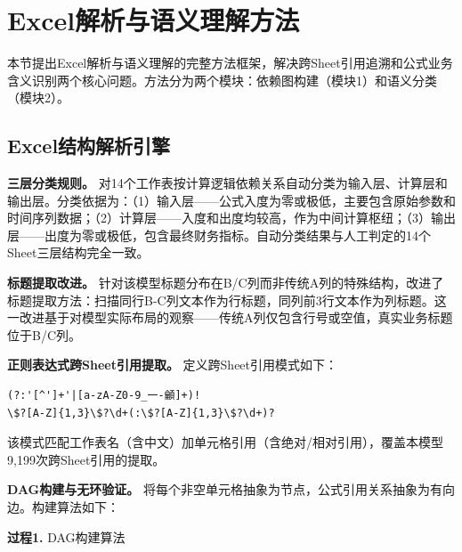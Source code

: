 \section{\heiti Excel解析与语义理解方法}

本节提出Excel解析与语义理解的完整方法框架，解决跨Sheet引用追溯和公式业务含义识别两个核心问题。方法分为两个模块：依赖图构建（模块1）和语义分类（模块2）。

\subsection{\heiti Excel结构解析引擎}

\textbf{三层分类规则。} 对14个工作表按计算逻辑依赖关系自动分类为输入层、计算层和输出层。分类依据为：（1）输入层——公式入度为零或极低，主要包含原始参数和时间序列数据；（2）计算层——入度和出度均较高，作为中间计算枢纽；（3）输出层——出度为零或极低，包含最终财务指标。自动分类结果与人工判定的14个Sheet三层结构完全一致。

\textbf{标题提取改进。} 针对该模型标题分布在B/C列而非传统A列的特殊结构，改进了标题提取方法：扫描同行B-C列文本作为行标题，同列前3行文本作为列标题。这一改进基于对模型实际布局的观察——传统A列仅包含行号或空值，真实业务标题位于B/C列。

\textbf{正则表达式跨Sheet引用提取。} 定义跨Sheet引用模式如下：
\begin{verbatim}
(?:'[^']+'|[a-zA-Z0-9_一-龥]+)!
\$?[A-Z]{1,3}\$?\d+(:\$?[A-Z]{1,3}\$?\d+)?
\end{verbatim}
该模式匹配工作表名（含中文）加单元格引用（含绝对/相对引用），覆盖本模型9,199次跨Sheet引用的提取。

\textbf{DAG构建与无环验证。} 将每个非空单元格抽象为节点，公式引用关系抽象为有向边。构建算法如下：

\textbf{过程1.} DAG构建算法

